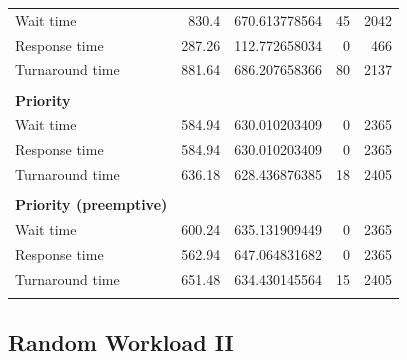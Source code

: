 \documentclass[12pt,letterpaper]{article}
\begin{document}
\begin{appendices}
\begin{table}[H]
\begin{tabular}{l r r r r}
					\hline
					Wait time &		830.4 &	670.613778564 &	45 &	2042  	\\
					Response time &		287.26 &	112.772658034 &	0 &	466 	\\
					Turnaround time &	881.64 &	686.207658366 &	80 &	2137 	\\
					\\
					\textbf{Priority} \\
					\hline
					Wait time &		584.94 &	630.010203409 &	0 &	2365 	\\
					Response time &		584.94 &	630.010203409 &	0 &	2365 	\\
					Turnaround time &	636.18 &	628.436876385 &	18 &	2405 	\\
					\\
					\textbf{Priority (preemptive)} \\
					\hline
					Wait time &		600.24 &	635.131909449 &	0 & 2365 	\\
					Response time &		562.94 &	647.064831682 &	0 &	2365 	\\
					Turnaround time &	651.48 &	634.430145564 &	15 &	2405 	\\
					\\
				\end{tabular}
				\label{table:data-rand1}
			\end{table}

			\subsection{Random Workload II}


\end{appendices}
\end{document}
